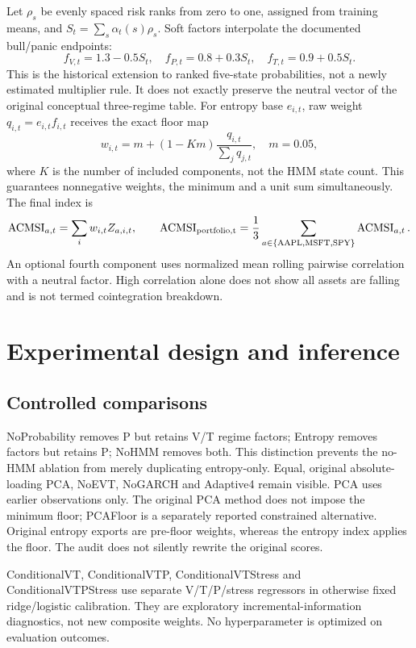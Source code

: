 \documentclass[11pt]{article}
\begin{document}
Let $\rho_s$ be evenly spaced risk ranks from zero to one, assigned from training means, and
$S_t=\sum_s\alpha_t(s)\rho_s$. Soft factors interpolate the documented bull/panic endpoints:
\begin{equation}
f_{V,t}=1.3-0.5S_t,\quad f_{P,t}=0.8+0.3S_t,\quad f_{T,t}=0.9+0.5S_t.
\end{equation}
This is the historical extension to ranked five-state probabilities, not a newly estimated multiplier
rule. It does not exactly preserve the neutral vector of the original conceptual three-regime table.
For entropy base $e_{i,t}$, raw weight $q_{i,t}=e_{i,t}f_{i,t}$ receives the exact floor map
\begin{equation}
w_{i,t}=m+(1-Km)\frac{q_{i,t}}{\sum_jq_{j,t}},\quad m=0.05,
\end{equation}
where $K$ is the number of included components, not the HMM state count. This guarantees nonnegative
weights, the minimum and a unit sum simultaneously. The final index is
\begin{equation}
\operatorname{ACMSI}_{a,t}=\sum_iw_{i,t}Z_{a,i,t},\qquad
\operatorname{ACMSI}_{\rm portfolio,t}=\frac13\sum_{a\in\{\mathrm{AAPL,MSFT,SPY}\}}
\operatorname{ACMSI}_{a,t}.
\end{equation}
An optional fourth component uses normalized mean rolling pairwise correlation with a neutral factor.
High correlation alone does not show all assets are falling and is not termed cointegration breakdown.

\section{Experimental design and inference}
\subsection{Controlled comparisons}
NoProbability removes P but retains V/T regime factors; Entropy removes factors but retains P;
NoHMM removes both. This distinction prevents the no-HMM ablation from merely duplicating entropy-only.
Equal, original absolute-loading PCA, NoEVT, NoGARCH and Adaptive4 remain visible. PCA uses earlier
observations only. The original PCA method does not impose the minimum floor; PCAFloor is a separately
reported constrained alternative. Original entropy exports are pre-floor weights, whereas the entropy
index applies the floor. The audit does not silently rewrite the original scores.

Conditional\-VT, Conditional\-VTP, Conditional\-VT\-Stress and Conditional\-VTP\-Stress use separate V/T/P/stress
regressors in otherwise fixed ridge/logistic calibration. They are exploratory incremental-information
diagnostics, not new composite weights. No hyperparameter is optimized on evaluation outcomes.
\end{document}

